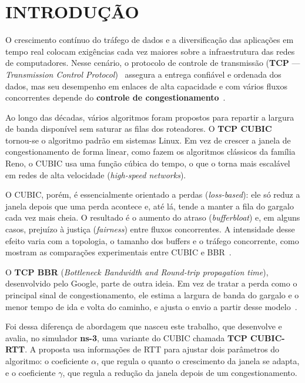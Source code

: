 \documentclass[a4paper,12pt]{monografia}
\begin{document}
\section{INTRODUÇÃO}
O crescimento contínuo do tráfego de dados e a diversificação das aplicações em tempo real colocam exigências cada vez maiores sobre a infraestrutura das redes de computadores. Nesse cenário, o protocolo de controle de transmissão (\textbf{TCP} --- \textit{Transmission Control Protocol})~\cite{rfc9293} assegura a entrega confiável e ordenada dos dados, mas seu desempenho em enlaces de alta capacidade e com vários fluxos concorrentes depende do \textbf{controle de congestionamento}~\cite{rfc5681}.

Ao longo das décadas, vários algoritmos foram propostos para repartir a largura de banda disponível sem saturar as filas dos roteadores. O \textbf{TCP CUBIC}~\cite{ha2008,rfc9438} tornou-se o algoritmo padrão em sistemas Linux. Em vez de crescer a janela de congestionamento de forma linear, como fazem os algoritmos clássicos da família Reno, o CUBIC usa uma função cúbica do tempo, o que o torna mais escalável em redes de alta velocidade (\textit{high-speed networks}).

O CUBIC, porém, é essencialmente orientado a perdas (\textit{loss-based}): ele só reduz a janela depois que uma perda acontece e, até lá, tende a manter a fila do gargalo cada vez mais cheia. O resultado é o aumento do atraso (\textit{bufferbloat}) e, em alguns casos, prejuízo à justiça (\textit{fairness}) entre fluxos concorrentes. A intensidade desse efeito varia com a topologia, o tamanho dos buffers e o tráfego concorrente, como mostram as comparações experimentais entre CUBIC e BBR~\cite{casas2022,ware2019}.

O \textbf{TCP BBR} (\textit{Bottleneck Bandwidth and Round-trip propagation time}), desenvolvido pelo Google, parte de outra ideia. Em vez de tratar a perda como o principal sinal de congestionamento, ele estima a largura de banda do gargalo e o menor tempo de ida e volta do caminho, e ajusta o envio a partir desse modelo~\cite{cardwell2017}.

Foi dessa diferença de abordagem que nasceu este trabalho, que desenvolve e avalia, no simulador \textbf{ns-3}, uma variante do CUBIC chamada \textbf{TCP CUBIC-RTT}. A proposta usa informações de RTT para ajustar dois parâmetros do algoritmo: o coeficiente $\alpha$, que regula o quanto o crescimento da janela se adapta, e o coeficiente $\gamma$, que regula a redução da janela depois de um congestionamento.
\end{document}

